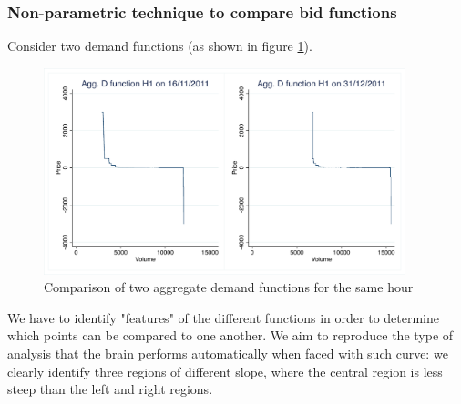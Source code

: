  
\subsubsection{Non-parametric technique to compare bid functions}
\label{comparablepoints}
Consider two demand functions (as shown in figure \ref{comparedfunc}). 
\begin{figure}[!ht]
\centering
\includegraphics[trim=0.1cm 0.1cm 0.1cm 0.1cm, clip=true, height= 60mm]{figch2/compare2d.pdf}
\caption{Comparison of two aggregate demand functions for the same hour}
\label{comparedfunc}
\end{figure}
 We have to identify "features" of the different functions in order to determine which points can be compared to one another. We aim to reproduce the type of analysis that the brain performs automatically when faced with such curve: we clearly identify three regions of different slope, where the central region is less steep than the left and right regions. \\

